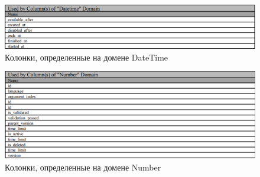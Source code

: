 \documentclass{article}
\begin{document}
\begin{figure}[H]
	\includegraphics[width=\textwidth, center]{DateTimeDomain.png}
	\caption{Колонки, определенные на домене DateTime}
\end{figure}

\begin{figure}[H]
	\includegraphics[width=\textwidth, center]{NumberDomain.png}
	\caption{Колонки, определенные на домене Number}
\end{figure}
\end{document}
